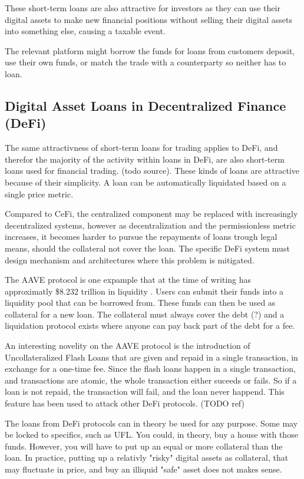 These short-term loans are also attractive for investors as they can use their digital assets to make new financial positions without selling their digital assets into something else, causing a taxable event. 

The relevant platform might borrow the funds for loans from customers deposit, use their own funds, or match the trade with a counterparty so neither has to loan.  

\subsection{Digital Asset Loans in Decentralized Finance (DeFi)}
The same attractivness of short-term loans for trading applies to DeFi, and therefor the majority of the activity within loans in DeFi, are also short-term loans used for financial trading. (todo source). These kinds of loans are attractive because of their simplicity. A loan can be automatically liquidated based on a single price metric. 

Compared to CeFi, the centralized component may be replaced with increasingly decentralized systems, however as decentralization and the permissionless metric increases, it becomes harder to pursue the repayments of loans trough legal means, should the collateral not cover the loan. The specific DeFi system must design mechanism and architectures where this problem is mitigated.

The AAVE protocol is one expample that at the time of writing has approximatly \$8.232 trillion in liquidity \cite{AaveOpen80:online}. Users can submit their funds into a liquidity pool that can be borrowed from. These funds can then be used as collateral for a new loan. The collateral must always cover the debt (?) and a liquidation protocol exists where anyone can pay back part of the debt for a fee. 

An interesting novelity on the AAVE protocol is the introduction of Uncollateralized Flash Loans that are given and repaid in a single transaction, in exchange for a one-time fee. Since the flash loans happen in a single transaction, and transactions are atomic, the whole transaction either suceeds or fails. So if a loan is not repaid, the transaction will fail, and the loan never happend. This feature has been used to attack other DeFi protocols. (TODO ref)

The loans from DeFi protocols can in theory be used for any purpose. Some may be locked to specifics, such as UFL. You could, in theory, buy a house with those funds. However, you will have to put up an equal or more collateral than the loan. In practice, putting up a relativly "risky" digital assets as collateral, that may fluctuate in price, and buy an illiquid "safe" asset does not makes sense. 

